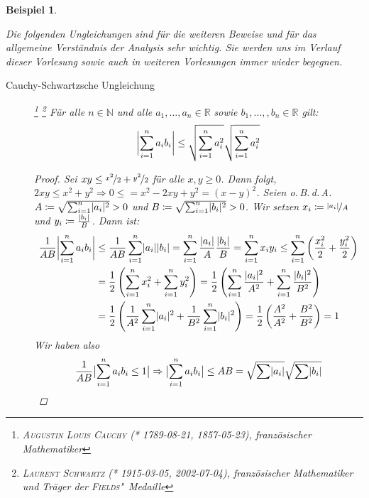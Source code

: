 \documentclass[ngerman,titlepage,twoside, parskip=half*]{scrreprt}
\newcommand*{\N}{\mathbb{N}}
\newcommand*{\R}{\mathbb{R}}
\theoremstyle{break}
\theoremstyle{nonumberbreak}
\newtheorem{beispiel}{Beispiel}
\newtheorem{proof}{Beweis:}
\DeclarePairedDelimiter{\abs}{\lvert}{\rvert}
\begin{document}
\begin{beispiel}
\begin{enumerate}
\begin{enumerate}[(M1)]
    Die folgenden Ungleichungen sind für die weiteren Beweise und für das
    allgemeine Verständnis der Analysis sehr wichtig. Sie werden uns im
    Verlauf dieser Vorlesung sowie auch in weiteren Vorlesungen immer wieder
    begegnen.
    \begin{description}
    \item[Cauchy-Schwartzsche Ungleichung]\footnote{\textsc{Augustin Louis
      Cauchy} (* 1789-08-21, \textdagger{} 1857-05-23), französischer Mathematiker}
      \footnote{\textsc{Laurent Schwartz} (* 1915-03-05, \textdagger{} 2002-07-04),
	französischer Mathematiker und Träger der \textsc{Fields}"~Medaille}
      Für alle $n\in\N$ und alle $a_1 ,\ldots ,a_n \in \R$ sowie
      $b_{1},\dotsc, ,b_n \in \R$ gilt:
      \begin{gather*}
	\abs[\bigg]{\sum_{i=1}^n a_i b_i} \leq \sqrt{\sum_{i=1}^n a_i^2}
	   \sqrt{\sum_{i=1}^n a_i^2}
      \end{gather*}
      \begin{proof}
	Sei $xy \leq\nicefrac{x^2}{2}+\nicefrac{y^2}{2}$ für alle $x,y \geq
	0$. Dann folgt, $2xy\leq x^{2}+y^{2}\Rightarrow0 \leq = x^2-2xy+y^2=
	(x-y)^{2}$. Seien o.\,B.\,d.\,A. $A\coloneqq\sqrt{\sum_{i=1}^n
	\abs{a_i}^2}>0$ und $B\coloneqq\sqrt{\sum_{i=1}^n \abs{b_i}^2}>0$. Wir
	setzen $x_i \coloneqq \nicefrac{\abs{a_i}}{A}$ und  $y_i
	\coloneqq\frac{\abs{b_i}}{B}$.  Dann ist:
      \begin{align*}
        \frac{1}{AB}\abs[\bigg]{\sum_{i=1}^n a_i b_i} &\leq
	   \frac{1}{AB}\sum_{i=1}^n \abs{a_i}\abs{b_i} = \sum_{i=1}^n
	   \frac{\abs{a_i}}{A} \frac{\abs{b_i}}{B} = \sum_{i=1}^n x_i y_i
	   \leq \sum_{i=1}^n \left(\frac{x_i^2}{2}+\frac{y_i^2}{2}\right)\\
	&= \frac{1}{2}\left(\sum_{i=1}^n x_i^2 + \sum_{i=1}^n y_i^2\right) =
	   \frac{1}{2} \left( \sum_{i=1}^n \frac{\abs{a_i}^2}{A^2} +
	   \sum_{i=1}^n \frac{\abs{b_i}^2}{B^2}\right)\\
        & = \frac{1}{2} \left( \frac{1}{A^2} \sum_{i=1}^n \abs{a_i}^2 +
	   \frac{1}{B^2} \sum_{i=1}^n \abs{b_i}^2\right) = \frac{1}{2} \left(
	   \frac{A^2}{A^2} + \frac{B^2}{B^2} \right)  = 1
      \end{align*}
	Wir haben also
	\begin{gather*}
	  \frac{1}{AB}\abs[\big]{\sum_{i=1}^{n} a_{i} b_{i}\leq1} \Rightarrow
	     \abs[\big]{\sum_{i=1}^{n}a_{i} b_{i}}\leq AB=
	     \sqrt{\sum\abs{a_{i}}} \sqrt{\sum\abs{b_{i}}}
	\end{gather*}
	

\end{proof}
\end{description}
\end{enumerate}
\end{enumerate}
\end{beispiel}
\end{document}
